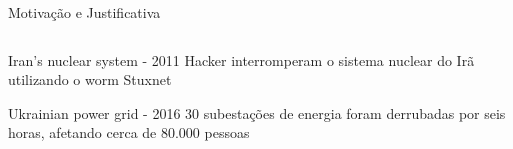 \documentclass{uspBeamer}
\begin{document}
\begin{frame}{Motivação e Justificativa}
\begin{columns}
\begin{column}{.5\textwidth}
{\begin{block}{Iran's nuclear system - 2011}
                        Hacker interromperam o sistema nuclear do Irã utilizando o worm Stuxnet
                    \end{block}
                    \begin{block}{Ukrainian power grid - 2016}
                        30 subestações de energia foram derrubadas por seis horas, afetando cerca de 80.000 pessoas
                    \end{block}
                }
            \end{column}
        \end{columns}
    \end{frame}
\end{document}
